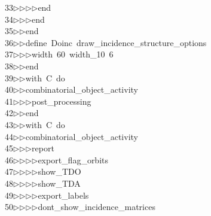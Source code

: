 \begin{tabbing}
33\>$\triangleright$\>$\triangleright$\>$\triangleright$\>$\triangleright$\>end\ \\[0pt]
34\>$\triangleright$\>$\triangleright$\>$\triangleright$\>end\ \\[0pt]
35\>$\triangleright$\>$\triangleright$\>end\ \\[0pt]
36\>$\triangleright$\>$\triangleright$\>define\ Doinc\ draw\_incidence\_structure\_options\ \\[0pt]
37\>$\triangleright$\>$\triangleright$\>$\triangleright$\>width\ 60\ width\_10\ 6\ \\[0pt]
38\>$\triangleright$\>$\triangleright$\>end\ \\[0pt]
39\>$\triangleright$\>$\triangleright$\>with\ C\ do\ \\[0pt]
40\>$\triangleright$\>$\triangleright$\>combinatorial\_object\_activity\ \\[0pt]
41\>$\triangleright$\>$\triangleright$\>$\triangleright$\>post\_processing\ \\[0pt]
42\>$\triangleright$\>$\triangleright$\>end\ \\[0pt]
43\>$\triangleright$\>$\triangleright$\>with\ C\ do\ \\[0pt]
44\>$\triangleright$\>$\triangleright$\>combinatorial\_object\_activity\ \\[0pt]
45\>$\triangleright$\>$\triangleright$\>$\triangleright$\>report\ \\[0pt]
46\>$\triangleright$\>$\triangleright$\>$\triangleright$\>$\triangleright$\>export\_flag\_orbits\ \\[0pt]
47\>$\triangleright$\>$\triangleright$\>$\triangleright$\>$\triangleright$\>show\_TDO\ \\[0pt]
48\>$\triangleright$\>$\triangleright$\>$\triangleright$\>$\triangleright$\>show\_TDA\ \\[0pt]
49\>$\triangleright$\>$\triangleright$\>$\triangleright$\>$\triangleright$\>export\_labels\ \\[0pt]
50\>$\triangleright$\>$\triangleright$\>$\triangleright$\>$\triangleright$\>dont\_show\_incidence\_matrices\ \\[0pt]

\end{tabbing}
